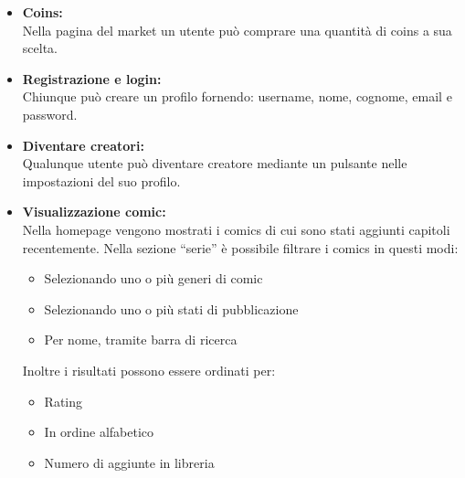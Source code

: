 \begin{itemize}
    \item \textbf{Coins:}
          \\Nella pagina del market un utente può comprare una quantità di coins a sua scelta.
    \item \textbf{Registrazione e login:}
          \\Chiunque può creare un profilo fornendo: username, nome, cognome, email e password.
    \item \textbf{Diventare creatori:}
          \\Qualunque utente può diventare creatore mediante un pulsante nelle impostazioni del suo profilo.
    \item \textbf{Visualizzazione comic:}
          \\Nella homepage vengono mostrati i comics di cui sono stati aggiunti capitoli recentemente. Nella sezione “serie” è possibile filtrare i comics in questi modi:
          \begin{itemize}
              \item Selezionando uno o più generi di comic
              \item Selezionando uno o più stati di pubblicazione
              \item Per nome, tramite barra di ricerca
          \end{itemize}
          Inoltre i risultati possono essere ordinati per:
          \begin{itemize}
              \item Rating
              \item In ordine alfabetico
              \item Numero di aggiunte in libreria
          \end{itemize}


\end{itemize}